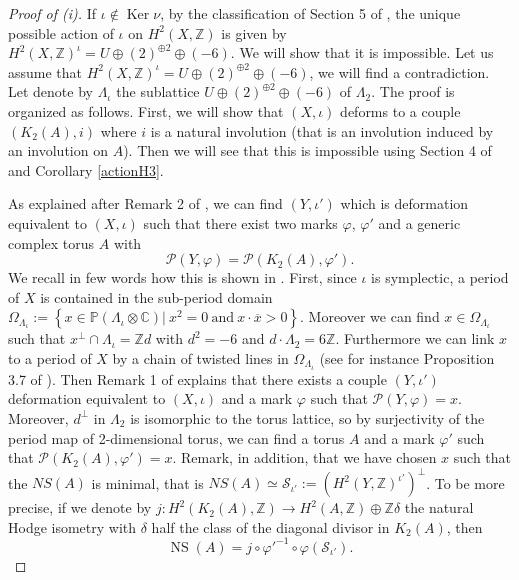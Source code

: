 \documentclass{alggeom}
\DeclareMathOperator{\Ker}{Ker}
\DeclareMathOperator{\NS}{NS}
\newcommand{\C}{\mathbb{C}}
\newcommand{\Z}{\mathbb{Z}}
\theoremstyle{plain}
\theoremstyle{definition}
\theoremstyle{remark}
\begin{document}
\begin{proof}[Proof of (i)]

If $\iota\notin \Ker \nu$, by the classification of Section 5 of \cite{MongWanTari}, the unique possible action of $\iota$ on $H^{2}(X,\Z)$ is given by $H^{2}(X,\Z)^{\iota}=U\oplus (2)^{\oplus2}\oplus(-6)$. We will show that it is impossible. Let us assume that $H^{2}(X,\Z)^{\iota}=U\oplus (2)^{\oplus2}\oplus(-6)$, we will find a contradiction. Let denote by $\Lambda_\iota$ the sublattice $U\oplus (2)^{\oplus2}\oplus(-6)$ of $\Lambda_2$. The proof is organized as follows. First, we will show that $(X,\iota)$ deforms to a couple $(K_2(A),i)$ where $i$ is a natural involution (that is an involution induced by an involution on $A$). Then we will see that this is impossible using Section 4 of \cite{MongWanTari0} and Corollary \ref{actionH3}. 

As explained after Remark 2 of \cite{MongardiDef}, we can find $(Y,\iota')$ which is deformation equivalent to $(X,\iota)$ such that there exist two marks $\varphi$, $\varphi'$ and a generic complex torus $A$ with 
$$\mathscr{P}(Y,\varphi)=\mathscr{P}(K_2(A),\varphi').$$
We recall in few words how this is shown in \cite{MongardiDef}. First, since $\iota$ is symplectic, a period of $X$ is contained in the sub-period domain $\Omega_{\Lambda_\iota}:= \left\{\left.x\in\mathbb{P}(\Lambda_\iota\otimes\C)\right|\ x^2=0\ \text{and}\ x\cdot\overline{x}>0\right\}$.
Moreover we can find $x\in \Omega_{\Lambda_\iota}$ such that $x^\bot\cap\Lambda_\iota=\Z d$ with $d^2=-6$ and $d\cdot \Lambda_2=6\Z$. Furthermore we can link $x$ to a period of $X$ by a chain of twisted lines in $\Omega_{\Lambda_\iota}$ (see for instance Proposition 3.7 of \cite{HuybrechtsSurvey}). 
Then Remark 1 of \cite{MongardiDef} explains that there exists a couple $(Y,\iota')$ deformation equivalent to $(X,\iota)$ and a mark $\varphi$ such that $\mathscr{P}(Y,\varphi)=x$. 
Moreover, $d^\bot$ in $\Lambda_2$ is isomorphic to the torus lattice, so by surjectivity of the period map of 2-dimensional torus, we can find a torus $A$ and a mark $\varphi'$ such that $\mathscr{P}(K_2(A),\varphi')=x$. 
Remark, in addition, that we have chosen $x$ such that the $NS(A)$ is minimal, that is $NS(A)\simeq \mathcal{S}_{\iota'}:=(H^2(Y,\Z)^{\iota'})^\bot$. To be more precise, if we denote by $j:H^2(K_2(A),\Z)\rightarrow H^2(A,\Z)\oplus\Z\delta$ the natural Hodge isometry with $\delta$ half the class of the diagonal divisor in $K_2(A)$, then 
\begin{equation}
\NS (A)=j\circ\varphi'^{-1}\circ \varphi(\mathcal{S}_{\iota'}).
\label{MongNS}
\end{equation}


\end{proof}
\end{document}
